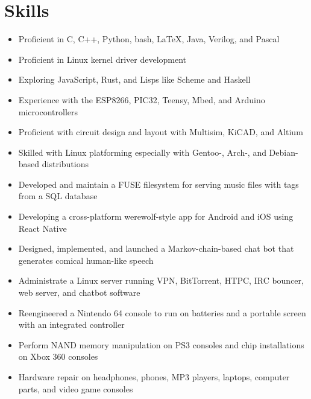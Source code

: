 \documentclass[letterpaper,10pt]{article}
\begin{document}
\section{Skills}
\begin{itemize}
\item Proficient in C, C++, Python, bash, \LaTeX, Java, Verilog, and Pascal
\item Proficient in Linux kernel driver development
\item Exploring JavaScript, Rust, and Lisps like Scheme and Haskell
\item Experience with the ESP8266, PIC32, Teensy, Mbed, and Arduino microcontrollers
\item Proficient with circuit design and layout with Multisim, KiCAD, and Altium
\item Skilled with Linux platforming especially with Gentoo-, Arch-, and Debian-based distributions
\item Developed and maintain a FUSE filesystem for serving music files with tags from a SQL database
\item Developing a cross-platform werewolf-style app for Android and iOS using React Native
\item Designed, implemented, and launched a Markov-chain-based chat bot that generates comical human-like speech
\item Administrate a Linux server running VPN, BitTorrent, HTPC, IRC bouncer, web server, and chatbot software
\item Reengineered a Nintendo 64 console to run on batteries and a portable screen with an integrated controller
\item Perform NAND memory manipulation on PS3 consoles and chip installations on Xbox 360 consoles
\item Hardware repair on headphones, phones, MP3 players, laptops, computer parts, and video game consoles
\end{itemize}
\end{document}
